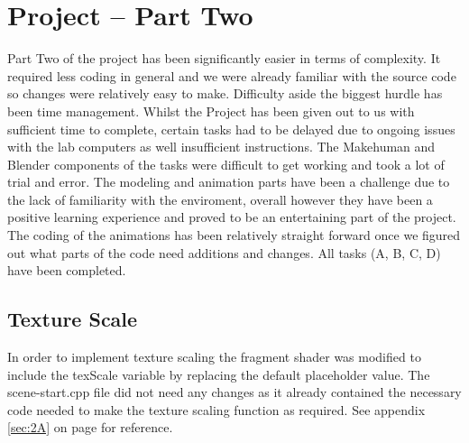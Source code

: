 \documentclass{article}
\begin{document}


\newpage

\section{Project -- Part Two} %

\begin{question}
	Part Two of the project has been significantly easier in terms of complexity. It required less coding in general and we were already familiar with the source code so changes were relatively easy to make.
	\newline
	\newline
	Difficulty aside the biggest hurdle has been time management. Whilst the Project has been given out to us with sufficient time to complete, certain tasks had to be delayed due to ongoing issues with the lab computers as well insufficient instructions. The Makehuman and Blender components of the tasks were difficult to get working and took a lot of trial and error.
	\newline
	\newline
	The modeling and animation parts have been a challenge due to the lack of familiarity with the enviroment, overall however they have been a positive learning experience and proved to be an entertaining part of the project. The coding of the animations has been relatively straight forward once we figured out what parts of the code need additions and changes.
	\newline
	\newline
	All tasks (A, B, C, D) have been completed.
\end{question}



\subsection{Texture Scale}
In order to implement texture scaling the fragment shader was modified to include the texScale variable by replacing the default placeholder value. The scene-start.cpp file did not need any changes as it already contained the necessary code needed to make the texture scaling function as required.
\newline
\newline
See appendix \ref{sec:2A} on page \pageref{sec:2A} for reference.
\end{document}
